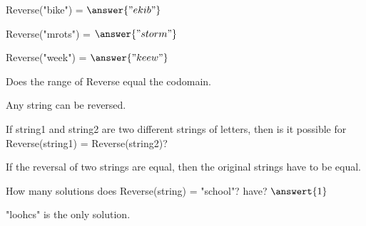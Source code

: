 \documentclass{ximera}
\begin{document}
\begin{exercise}


\begin{exercise}
Reverse("bike") = $\answer{"ekib"}$
\end{exercise}


\begin{exercise}
Reverse("mrots") = $\answer{"storm"}$
\end{exercise}


\begin{exercise}
Reverse("week") = $\answer{"keew"}$
\end{exercise}








\begin{exercise}

Does the range of Reverse equal the codomain.

  \begin{multipleChoice}
  \end{multipleChoice}
  \begin{feedback}
Any string can be reversed.
  \end{feedback}
\end{exercise}




\begin{exercise}

If string1 and string2 are two different strings of letters, then is it possible for Reverse(string1) = Reverse(string2)?

  \begin{multipleChoice}
  \end{multipleChoice}
  \begin{feedback}
If the reversal of two strings are equal, then the original strings have to be equal.
  \end{feedback}
\end{exercise}








\begin{exercise}

How many solutions does Reverse(string) = "school"? have? $\answert{1}$


  \begin{feedback}
"loohcs" is the only solution.
  \end{feedback}
\end{exercise}









\end{exercise}
\end{document}
